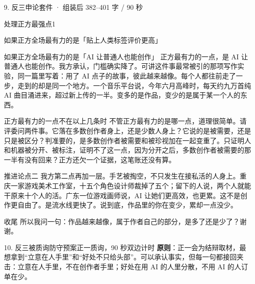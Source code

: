 \documentclass[script,con]{debate}
\begin{document}
\begin{kit}{9. 反三申论}{套件 · 组装后 382–401 字 / 90 秒}
\begin{pick}{处理正方最强点}{1}
\begin{module}{如果正方全场最有力的是「贴上人类标签评价更高」}
\end{module}
\begin{module}{如果正方全场最有力的是「AI 让普通人也能创作」}
正方最有力的一点，是 AI 让普通人也能创作。我方承认，门槛确实降了。可讲这件事最常被引的那项写作实验，同一篇里写着：用了 AI 点子的故事，彼此越来越像。每个人都往前走了一步，走到的却是同一个地方。一个音乐平台说，今年六月高峰时，每天约九万首纯 AI 曲目涌进来，超过新上传的一半。变多的是作品，变少的是属于某一个人的东西。
\end{module}
\begin{fallback}{正方最有力的一点不在以上几条时}
不管正方最有力的是哪一点，道理很简单。请评委问两件事。它落在多数创作者身上，还是少数人身上？它说的是被需要，还是只是被区分？判准要的，是多数创作者被需要和被珍视加在一起变重了。只证明人和机器被分开、被标注，证明不了这一点，因为分开之后，多数创作者被需要的那一半有没有回来？正方还欠一个证据，这笔账还没有算。
\end{fallback}
\end{pick}
\begin{fixed}{推进论点二}
我方第二点再加一层。手艺被掏空，不只发生在接私活的人身上。重庆一家游戏美术工作室，十五个角色设计师裁掉了五个；留下的人说，两个人就能干原来十个人的活。广东一位游戏画师说，AI 让她们更高效，也更累。这不是创作更自由了。是流水线更快了。说到底，作品里的你在变少，累却一点没少。
\end{fixed}
\begin{fixed}{收尾}
所以我问一句：作品越来越像，属于作者自己的部分，是多了还是少了？谢谢。
\end{fixed}
\end{kit}

\begin{stage}{10. 反三被质询防守预案}{正一质询，90 秒双边计时}
\textbf{原则}：正一会为结辩取材，最想拿到“立意在人手里”和“好处不只给头部”。可以承认事实，但每一句都接回夹击：立意在人手里，不在创作者手里；好处在用 AI 的人里分散，不用 AI 的人订单在少。
\begin{qa}
\end{qa}
\end{stage}
\end{document}

